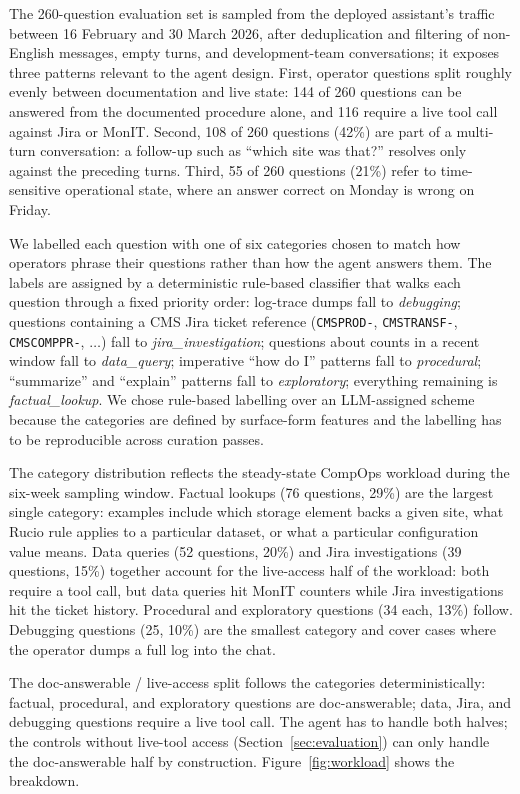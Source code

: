 The 260-question evaluation set is sampled from the deployed
assistant's traffic between 16 February and 30 March 2026, after
deduplication and filtering of non-English messages, empty turns,
and development-team conversations; it exposes three patterns
relevant to the agent design.
First, operator questions split roughly evenly between
documentation and live state: 144 of 260 questions can be answered
from the documented procedure alone, and 116 require a live tool
call against Jira or MonIT.
Second, 108 of 260 questions (42\%) are part of a multi-turn
conversation: a follow-up such as ``which site was that?''
resolves only against the preceding turns.
Third, 55 of 260 questions (21\%) refer to time-sensitive
operational state, where an answer correct on Monday is wrong on
Friday.

We labelled each question with one of six categories chosen to
match how operators phrase their questions rather than how the
agent answers them.
The labels are assigned by a deterministic rule-based classifier
that walks each question through a fixed priority order: log-trace
dumps fall to \textit{debugging}; questions containing a CMS Jira
ticket reference (\texttt{CMSPROD-}, \texttt{CMSTRANSF-},
\texttt{CMSCOMPPR-}, $\dots$) fall to \textit{jira\_investigation};
questions about counts in a recent window fall to
\textit{data\_query}; imperative ``how do I'' patterns fall to
\textit{procedural}; ``summarize'' and ``explain'' patterns fall
to \textit{exploratory}; everything remaining is
\textit{factual\_lookup}.
We chose rule-based labelling over an LLM-assigned scheme because
the categories are defined by surface-form features and the
labelling has to be reproducible across curation passes.

The category distribution reflects the steady-state CompOps
workload during the six-week sampling window.
Factual lookups (76 questions, 29\%) are the largest single
category: examples include which storage element backs a given
site, what Rucio rule applies to a particular dataset, or what a
particular configuration value means.
Data queries (52 questions, 20\%) and Jira investigations (39
questions, 15\%) together account for the live-access half of the
workload: both require a tool call, but data queries hit MonIT
counters while Jira investigations hit the ticket history.
Procedural and exploratory questions (34 each, 13\%) follow.
Debugging questions (25, 10\%) are the smallest category and
cover cases where the operator dumps a full log into the chat.

The doc-answerable / live-access split follows the categories
deterministically: factual, procedural, and exploratory questions
are doc-answerable; data, Jira, and debugging questions require a
live tool call.
The agent has to handle both halves; the controls without
live-tool access (Section~\ref{sec:evaluation}) can only handle
the doc-answerable half by construction.
Figure~\ref{fig:workload} shows the breakdown.

